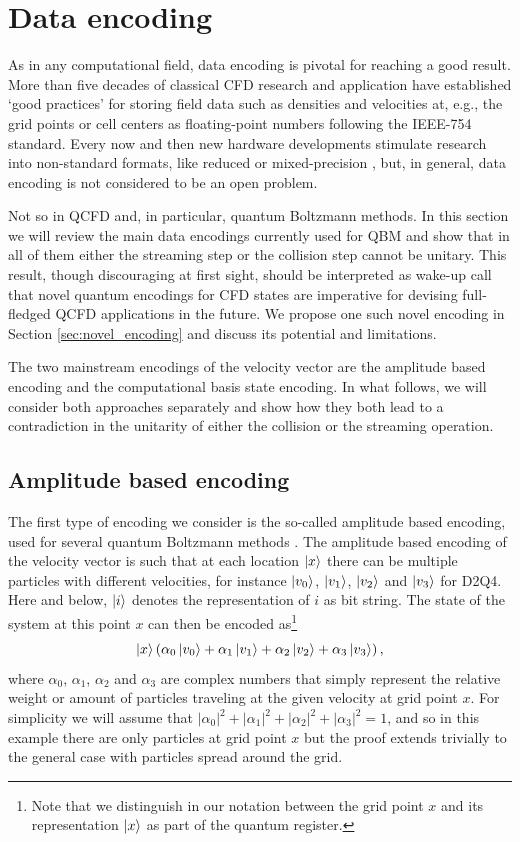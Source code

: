 \section{Data encoding}\label{sec:proof}
As in any computational field, data encoding is pivotal for reaching a good result. More than five decades of classical CFD research and application have established `good practices' for storing field data such as densities and velocities at, e.g., the grid points or cell centers as floating-point numbers following the IEEE-754 standard. Every now and then new hardware developments stimulate research into non-standard formats, like reduced or mixed-precision \cite{Freytag2022}, but, in general, data encoding is not considered to be an open problem.

Not so in QCFD and, in particular, quantum Boltzmann methods. In this section we will review the main data encodings currently used for QBM and show that in all of them either the streaming step or the collision step cannot be unitary. This result, though discouraging at first sight, should be interpreted as wake-up call that novel quantum encodings for CFD states are imperative for devising full-fledged QCFD applications in the future. We propose one such novel encoding in Section \ref{sec:novel_encoding} and discuss its potential and limitations.

The two mainstream encodings of the velocity vector are the amplitude based encoding and the computational basis state encoding. In what follows, we will consider both approaches separately and show how they both lead to a contradiction in the unitarity of either the collision or the streaming operation. 

\subsection{Amplitude based encoding}\label{ssec:amplitude_based_encoding}
The first type of encoding we consider is the so-called amplitude based encoding, used for several quantum Boltzmann methods \cite{Todorova2020, Budinski2020, Budinski2021, Schalkers2022}.
The amplitude based encoding of the velocity vector is such that at each location $\ket{x}$ there can be multiple particles with different velocities, for instance $\ket{v_0}$, $\ket{v_1}$, $\ket{v_2}$ and $\ket{v_3}$ for D2Q4. Here and below, $\ket{i}$ denotes the representation of $i$ as bit string. The state of the system at this point $x$ can then be encoded as\footnote{Note that we distinguish in our notation between the grid point $x$ and its representation $\ket{x}$ as part of the quantum register.}
\begin{equation}
\ket{x}\left (\alpha_0\ket{v_0} + \alpha_1\ket{v_1} + \alpha_2\ket{v_2} + \alpha_3\ket{v_3} \right ),
\end{equation}
where $\alpha_0$, $\alpha_1$, $\alpha_2$ and $\alpha_3$ are complex numbers that simply represent the relative weight or amount of particles traveling at the given velocity at grid point $x$. For simplicity we will assume that $|\alpha_0|^2+|\alpha_1|^2+|\alpha_2|^2+|\alpha_3|^2=1$, and so in this example there are only particles at grid point $x$ but the proof extends trivially to the general case with particles spread around the grid.

